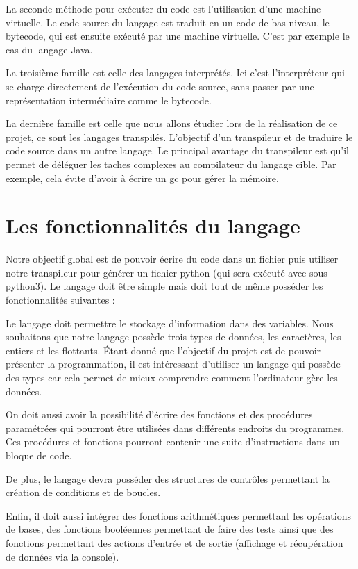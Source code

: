 \documentclass[a4paper]{article}%
\begin{document}
La seconde méthode pour exécuter du code est l'utilisation d'une machine
virtuelle. Le code source du langage est traduit en un code de bas niveau, le
\gls{bytecode}, qui est ensuite exécuté par une machine virtuelle. C'est par exemple
le cas du langage Java.

La troisième famille est celle des langages interprétés. Ici c'est
l'interpréteur qui se charge directement de l'exécution du code source, sans
passer par une représentation intermédiaire comme le \gls{bytecode}.

La dernière famille est celle que nous allons étudier lors de la réalisation de
ce projet, ce sont les langages transpilés. L'objectif d'un transpileur et de
traduire le code source dans un autre langage. Le principal avantage du
transpileur est qu'il permet de déléguer les taches complexes au compilateur du
langage cible. Par exemple, cela évite d'avoir à écrire un \gls{gc} pour gérer
la mémoire.

\section{Les fonctionnalités du langage}

Notre objectif global est de pouvoir écrire du code dans un fichier puis
utiliser notre transpileur pour générer un fichier python (qui sera exécuté avec
sous python3). Le langage doit être simple mais doit tout de même posséder les
fonctionnalités suivantes :

Le langage doit permettre le stockage d'information dans des variables. Nous
souhaitons que notre langage possède trois types de données, les caractères, les
entiers et les flottants. Étant donné que l'objectif du projet est de pouvoir
présenter la programmation, il est intéressant d'utiliser un langage qui possède
des types car cela permet de mieux comprendre comment l'ordinateur gère les
données.

On doit aussi avoir la possibilité d'écrire des fonctions et des procédures
paramétrées qui pourront être utilisées dans différents endroits du programmes.
Ces procédures et fonctions pourront contenir une suite d'instructions dans un
bloque de code.

De plus, le langage devra posséder des structures de contrôles permettant la
création de conditions et de boucles.

Enfin, il doit aussi intégrer des fonctions arithmétiques permettant les
opérations de bases, des fonctions booléennes permettant de faire des
tests ainsi que des fonctions permettant des actions d'entrée et de sortie
(affichage et récupération de données via la console).
\end{document}
